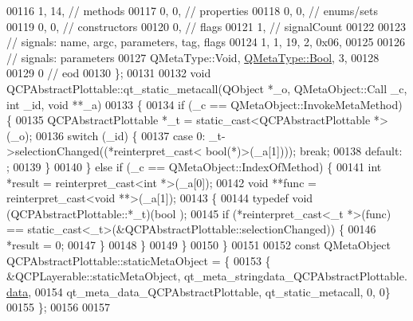 \begin{DoxyCode}
00116        1,   14, \textcolor{comment}{// methods}
00117        0,    0, \textcolor{comment}{// properties}
00118        0,    0, \textcolor{comment}{// enums/sets}
00119        0,    0, \textcolor{comment}{// constructors}
00120        0,       \textcolor{comment}{// flags}
00121        1,       \textcolor{comment}{// signalCount}
00122 
00123  \textcolor{comment}{// signals: name, argc, parameters, tag, flags}
00124        1,    1,   19,    2, 0x06,
00125 
00126  \textcolor{comment}{// signals: parameters}
00127     QMetaType::Void, \hyperlink{a00001_a76a8b016e5ad61faf9062cc387df5016}{QMetaType::Bool},    3,
00128 
00129        0        \textcolor{comment}{// eod}
00130 \};
00131 
00132 \textcolor{keywordtype}{void} QCPAbstractPlottable::qt\_static\_metacall(QObject *\_o, QMetaObject::Call \_c, \textcolor{keywordtype}{int} \_id, \textcolor{keywordtype}{void} **\_a)
00133 \{
00134     \textcolor{keywordflow}{if} (\_c == QMetaObject::InvokeMetaMethod) \{
00135         QCPAbstractPlottable *\_t = \textcolor{keyword}{static\_cast<}QCPAbstractPlottable *\textcolor{keyword}{>}(\_o);
00136         \textcolor{keywordflow}{switch} (\_id) \{
00137         \textcolor{keywordflow}{case} 0: \_t->selectionChanged((*\textcolor{keyword}{reinterpret\_cast<} \textcolor{keywordtype}{bool}(*)\textcolor{keyword}{>}(\_a[1]))); \textcolor{keywordflow}{break};
00138         \textcolor{keywordflow}{default}: ;
00139         \}
00140     \} \textcolor{keywordflow}{else} \textcolor{keywordflow}{if} (\_c == QMetaObject::IndexOfMethod) \{
00141         \textcolor{keywordtype}{int} *result = \textcolor{keyword}{reinterpret\_cast<}\textcolor{keywordtype}{int} *\textcolor{keyword}{>}(\_a[0]);
00142         \textcolor{keywordtype}{void} **func = \textcolor{keyword}{reinterpret\_cast<}\textcolor{keywordtype}{void} **\textcolor{keyword}{>}(\_a[1]);
00143         \{
00144             \textcolor{keyword}{typedef} void (QCPAbstractPlottable::*\_t)(bool );
00145             \textcolor{keywordflow}{if} (*reinterpret\_cast<\_t *>(func) == \textcolor{keyword}{static\_cast<}\_t\textcolor{keyword}{>}(&QCPAbstractPlottable::selectionChanged)) 
      \{
00146                 *result = 0;
00147             \}
00148         \}
00149     \}
00150 \}
00151 
00152 \textcolor{keyword}{const} QMetaObject QCPAbstractPlottable::staticMetaObject = \{
00153     \{ &QCPLayerable::staticMetaObject, qt\_meta\_stringdata\_QCPAbstractPlottable.
      \hyperlink{a00016_ac951832cc81d6220c552b96fc4354c89}{data},
00154       qt\_meta\_data\_QCPAbstractPlottable,  qt\_static\_metacall, 0, 0\}
00155 \};
00156 
00157 

\end{DoxyCode}

